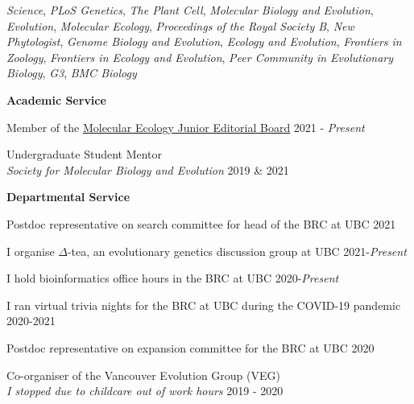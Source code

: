 \documentclass[11pt]{article}
\newcommand{\halfblankline}{\quad\vspace{-0.3\baselineskip}\pagebreak[2]}
\begin{document}
\emph{Science}, \emph{PLoS Genetics}, \emph{The Plant Cell}, \emph{Molecular Biology and Evolution}, \emph{Evolution}, \emph{Molecular Ecology}, \emph{Proceedings of the Royal Society B},  \emph{New Phytologist}, \emph{Genome Biology and Evolution}, \emph{Ecology and Evolution}, \emph{Frontiers in Zoology}, \emph{Frontiers in Ecology and Evolution}, \emph{Peer Community in Evolutionary Biology}, \emph{G3}, \emph{BMC Biology}  

\halfblankline

  \setlength\itemsep{0.3em}



	\vspace{.1275in}

{\bf Academic Service}
\vspace{.1275in}

Member of the \href{https://onlinelibrary.wiley.com/page/journal/1365294x/homepage/editorialboard.html}{Molecular Ecology Junior Editorial Board} \hfill 2021 - \textit{Present}
\vspace{4pt}

Undergraduate Student Mentor \\\textit{Society for Molecular Biology and Evolution} \hfill 2019 \& 2021 
	
\vspace{.1275in}


	{\bf Departmental Service}
\vspace{.1275in}

Postdoc representative on search committee for head of the BRC at UBC \hfill 2021

\vspace{3pt}
I organise $\Delta$-tea, an evolutionary genetics discussion group at UBC \hfill 2021-\textit{Present}
	
\vspace{3pt}
I hold bioinformatics office hours in the BRC at UBC \hfill 2020-\textit{Present}
	
\vspace{3pt}
I ran virtual trivia nights for the BRC at UBC during the COVID-19 pandemic \hfill 2020-2021
	
\vspace{3pt}
Postdoc representative on expansion committee for the BRC at UBC \hfill 2020

\vspace{3pt}
Co-organiser of the Vancouver Evolution Group (VEG)\\\emph{I stopped due to childcare out of work hours} \hfill 2019 - 2020 
\end{document}
